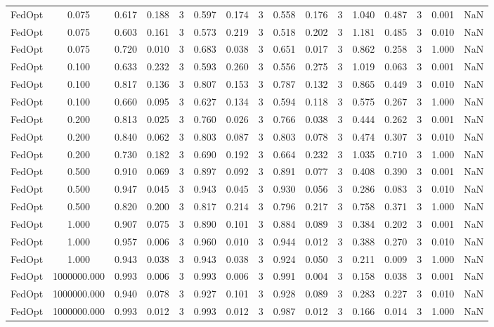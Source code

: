 \begin{table}[htbp]
\begin{tabular}{lccccccccccccccc}
FedOpt & 0.075 & 0.617 & 0.188 & 3 & 0.597 & 0.174 & 3 & 0.558 & 0.176 & 3 & 1.040 & 0.487 & 3 & 0.001 & NaN \\
FedOpt & 0.075 & 0.603 & 0.161 & 3 & 0.573 & 0.219 & 3 & 0.518 & 0.202 & 3 & 1.181 & 0.485 & 3 & 0.010 & NaN \\
FedOpt & 0.075 & 0.720 & 0.010 & 3 & 0.683 & 0.038 & 3 & 0.651 & 0.017 & 3 & 0.862 & 0.258 & 3 & 1.000 & NaN \\
FedOpt & 0.100 & 0.633 & 0.232 & 3 & 0.593 & 0.260 & 3 & 0.556 & 0.275 & 3 & 1.019 & 0.063 & 3 & 0.001 & NaN \\
FedOpt & 0.100 & 0.817 & 0.136 & 3 & 0.807 & 0.153 & 3 & 0.787 & 0.132 & 3 & 0.865 & 0.449 & 3 & 0.010 & NaN \\
FedOpt & 0.100 & 0.660 & 0.095 & 3 & 0.627 & 0.134 & 3 & 0.594 & 0.118 & 3 & 0.575 & 0.267 & 3 & 1.000 & NaN \\
FedOpt & 0.200 & 0.813 & 0.025 & 3 & 0.760 & 0.026 & 3 & 0.766 & 0.038 & 3 & 0.444 & 0.262 & 3 & 0.001 & NaN \\
FedOpt & 0.200 & 0.840 & 0.062 & 3 & 0.803 & 0.087 & 3 & 0.803 & 0.078 & 3 & 0.474 & 0.307 & 3 & 0.010 & NaN \\
FedOpt & 0.200 & 0.730 & 0.182 & 3 & 0.690 & 0.192 & 3 & 0.664 & 0.232 & 3 & 1.035 & 0.710 & 3 & 1.000 & NaN \\
FedOpt & 0.500 & 0.910 & 0.069 & 3 & 0.897 & 0.092 & 3 & 0.891 & 0.077 & 3 & 0.408 & 0.390 & 3 & 0.001 & NaN \\
FedOpt & 0.500 & 0.947 & 0.045 & 3 & 0.943 & 0.045 & 3 & 0.930 & 0.056 & 3 & 0.286 & 0.083 & 3 & 0.010 & NaN \\
FedOpt & 0.500 & 0.820 & 0.200 & 3 & 0.817 & 0.214 & 3 & 0.796 & 0.217 & 3 & 0.758 & 0.371 & 3 & 1.000 & NaN \\
FedOpt & 1.000 & 0.907 & 0.075 & 3 & 0.890 & 0.101 & 3 & 0.884 & 0.089 & 3 & 0.384 & 0.202 & 3 & 0.001 & NaN \\
FedOpt & 1.000 & 0.957 & 0.006 & 3 & 0.960 & 0.010 & 3 & 0.944 & 0.012 & 3 & 0.388 & 0.270 & 3 & 0.010 & NaN \\
FedOpt & 1.000 & 0.943 & 0.038 & 3 & 0.943 & 0.038 & 3 & 0.924 & 0.050 & 3 & 0.211 & 0.009 & 3 & 1.000 & NaN \\
FedOpt & 1000000.000 & 0.993 & 0.006 & 3 & 0.993 & 0.006 & 3 & 0.991 & 0.004 & 3 & 0.158 & 0.038 & 3 & 0.001 & NaN \\
FedOpt & 1000000.000 & 0.940 & 0.078 & 3 & 0.927 & 0.101 & 3 & 0.928 & 0.089 & 3 & 0.283 & 0.227 & 3 & 0.010 & NaN \\
FedOpt & 1000000.000 & 0.993 & 0.012 & 3 & 0.993 & 0.012 & 3 & 0.987 & 0.012 & 3 & 0.166 & 0.014 & 3 & 1.000 & NaN \\
\bottomrule
\end{tabular}
\end{table}
